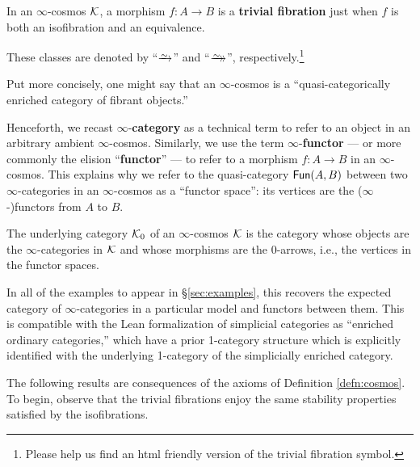 \begin{definition}\label{defn:trivial-fibration}
  In an $\infty$-cosmos ${\mathord{\mathcal{K}}}$, a morphism $f\colon A \to B$ is a \textbf{trivial fibration} just when $f$ is both an isofibration and an equivalence.
\end{definition}

These classes are denoted by ``$\we$''  and ``$\trvfib$'', respectively.\footnote{Please help us find an html friendly version of the trivial fibration symbol.}

Put more concisely, one might say that an $\infty$-cosmos is a ``quasi-cat\-e\-go\-ri\-cal\-ly enriched category of fibrant objects.'' %

\begin{con}
  Henceforth, we recast $\infty$-\textbf{category} as a technical term to refer to an object in an arbitrary ambient $\infty$-cosmos. Similarly, we use the term $\infty$-\textbf{functor} --- or more commonly the elision ``\textbf{functor}'' --- to refer to a morphism $f \colon A \to B$ in an $\infty$-cosmos. This explains why we refer to the quasi-category ${\mathord{\mathsf{Fun}}}(A,B)$ between two $\infty$-categories in an $\infty$-cosmos as a ``functor space'': its vertices are the ($\infty$-)functors from $A$ to $B$.
\end{con}

\begin{definition}\label{defn:underlying-cat-of-cosmos}
   The underlying category ${\mathord{\mathcal{K}}}_0$ of an $\infty$-cosmos ${\mathord{\mathcal{K}}}$ is the category whose objects are the $\infty$-categories in ${\mathord{\mathcal{K}}}$ and whose morphisms are the $0$-arrows, i.e., the vertices in the functor spaces.
\end{definition}

In all of the examples to appear in \S\ref{sec:examples}, this recovers the expected category of $\infty$-categories in a particular model and functors between them. This is compatible with the Lean formalization of simplicial categories as ``enriched ordinary categories,'' which have a prior 1-category structure which is explicitly identified with the underlying 1-category of the simplicially enriched category.

The following results are consequences of the axioms of Definition \ref{defn:cosmos}. To begin, observe that the trivial fibrations enjoy the same stability properties satisfied by the isofibrations.


